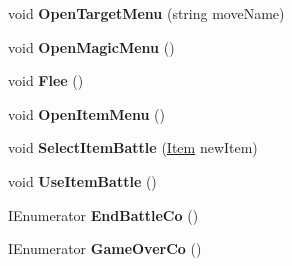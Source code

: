 \begin{DoxyCompactItemize}
\mbox{\label{class_battle_manager_a27b4fa121c8ec45895e306c1717dee2d}} 
void {\bfseries Open\+Target\+Menu} (string move\+Name)
\item 
\mbox{\label{class_battle_manager_a54b333967dadb3839d7f385636a4a618}} 
void {\bfseries Open\+Magic\+Menu} ()
\item 
\mbox{\label{class_battle_manager_ad85f3f8904914251937d9f0fbcce3da1}} 
void {\bfseries Flee} ()
\item 
\mbox{\label{class_battle_manager_ae2a435f44d9769abb08f65645eb394c8}} 
void {\bfseries Open\+Item\+Menu} ()
\item 
\mbox{\label{class_battle_manager_aa7baa8d3aa675a21f93411c11739dbf9}} 
void {\bfseries Select\+Item\+Battle} (\mbox{\hyperlink{class_item}{Item}} new\+Item)
\item 
\mbox{\label{class_battle_manager_a4fe2c16790d0569ec0bb2e9d3d7573d3}} 
void {\bfseries Use\+Item\+Battle} ()
\item 
\mbox{\label{class_battle_manager_ac9aa9ec4ec9ca738a98fa9e1afb2f43c}} 
I\+Enumerator {\bfseries End\+Battle\+Co} ()
\item 
\mbox{\label{class_battle_manager_a1df91f31a7254958c88860c701cdf94f}} 
I\+Enumerator {\bfseries Game\+Over\+Co} ()
\end{DoxyCompactItemize}
